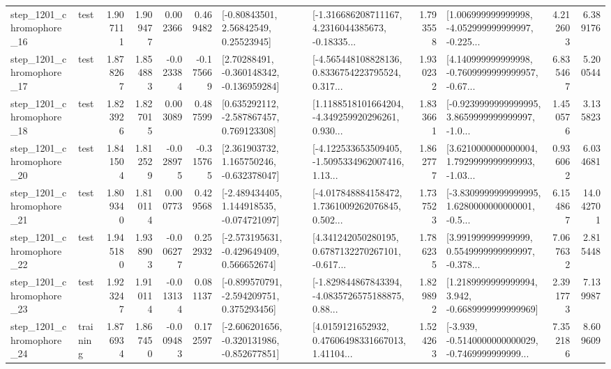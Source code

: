 \begin{tabular}{llrrrrllrlrr}
 step\_1201\_chromophore\_16 &      test &      1.907111 &    1.909477 &      0.002366 &  0.469482 &       [-0.80843501, 2.56842549, 0.25523945] &  [-1.316686208711167, 4.2316044385673, -0.18335... &       1.793558 &  [1.006999999999998, -4.052999999999997, -0.225... &            4.212603 &          6.389176 \\
 step\_1201\_chromophore\_17 &      test &      1.878267 &    1.854883 &     -0.023384 & -0.175669 &    [2.70288491, -0.360148342, -0.136959284] &  [-4.565448108828136, 0.8336754223795524, 0.317... &       1.930232 &  [4.140999999999998, -0.7609999999999957, -0.67... &            6.835467 &          5.200544 \\
 step\_1201\_chromophore\_18 &      test &      1.823926 &    1.827015 &      0.003089 &  0.487599 &    [0.635292112, -2.587867457, 0.769123308] &  [1.1188518101664204, -4.349259920296261, 0.930... &       1.833661 &  [-0.9239999999999995, 3.8659999999999997, -1.0... &            1.450576 &          3.135823 \\
 step\_1201\_chromophore\_20 &      test &      1.841504 &    1.812529 &     -0.028975 & -0.315765 &    [2.361903732, 1.165750246, -0.632378047] &  [-4.122533653509405, -1.5095334962007416, 1.13... &       1.862777 &  [3.6210000000000004, 1.7929999999999993, -1.03... &            0.936062 &          6.034681 \\
 step\_1201\_chromophore\_21 &      test &      1.809340 &    1.810114 &      0.000773 &  0.429568 &   [-2.489434405, 1.144918535, -0.074721097] &  [-4.017848884158472, 1.7361009262076845, 0.502... &       1.737523 &  [-3.8309999999999995, 1.6280000000000001, -0.5... &            6.154867 &         14.042701 \\
 step\_1201\_chromophore\_22 &      test &      1.945180 &    1.938903 &     -0.006277 &  0.252932 &   [-2.573195631, -0.429649409, 0.566652674] &  [4.341242050280195, 0.6787132270267101, -0.617... &       1.786235 &  [3.991999999999999, 0.5549999999999997, -0.378... &            7.067632 &          2.815448 \\
 step\_1201\_chromophore\_23 &      test &      1.923247 &    1.910114 &     -0.013134 &  0.081137 &   [-0.899570791, -2.594209751, 0.375293456] &  [-1.829844867843394, -4.0835726575188875, 0.88... &       1.829892 &   [1.2189999999999994, 3.942, -0.6689999999999969] &            2.391773 &          7.139987 \\
 step\_1201\_chromophore\_24 &  training &      1.876934 &    1.867450 &     -0.009483 &  0.172597 &  [-2.606201656, -0.320131986, -0.852677851] &  [4.0159121652932, 0.47606498331667013, 1.41104... &       1.524263 &  [-3.939, -0.5140000000000029, -0.7469999999999... &            7.352186 &          8.609609 \\

\end{tabular}
